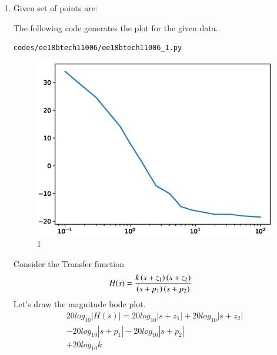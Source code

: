 \begin{enumerate}[label=\thesubsection.\arabic*.,ref=\thesubsection.\theenumi]

\item Given set of points are:
\begin{table}[!ht]
\centering

\caption{}
\label{table:ee18btech11006}
\end{table}
\solution 
The following code generates the plot for the given data.
\begin{lstlisting}
codes/ee18btech11006/ee18btech11006_1.py
\end{lstlisting}
\begin{figure}[!ht]
\centering
\includegraphics[width=\columnwidth]{./figs/ee18btech11006/ee18btech11006_1.eps}
\caption{1}
\label{fig:ee18btech11006_1}
\end{figure}
Consider the Transfer function
\begin{align}
H(s) &= \frac{k\left(s+z_{1}\right)\left(s+z_{2}\right)}{\left(s+p_{1}\right)\left(s+p_{2}\right)} 
\end{align}
Let's draw the magnitude bode plot.
\begin{multline}
20log_{10}|H(s)| = 20log_{10}|s+z_{1}|+20log_{10}|s+z_{2}|\\
-20log_{10}|s+p_{1}|-20log_{10}|s+p_{2}|\\
+20log_{10}k
\end{multline}


\end{enumerate}
